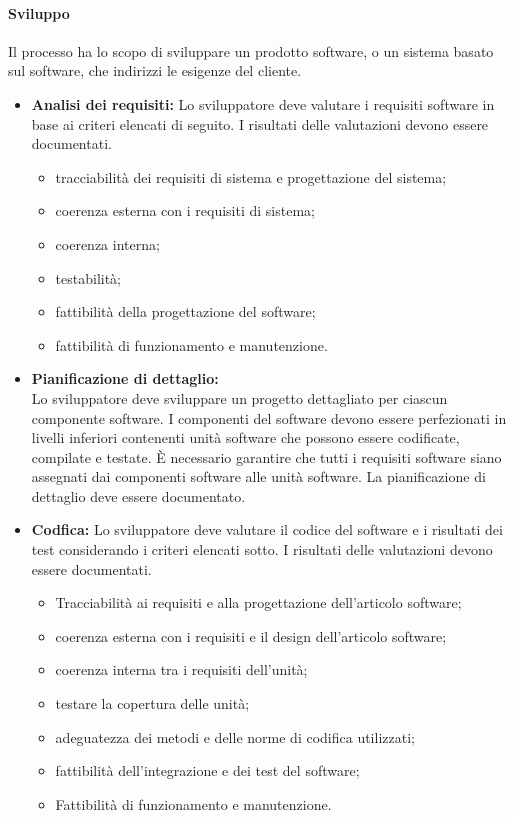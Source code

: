\paragraph{Sviluppo}
Il processo ha lo scopo di sviluppare un prodotto software, o un sistema basato sul software, che indirizzi le esigenze del cliente.
\begin{itemize}
    \item \textbf{Analisi dei requisiti:}
    Lo sviluppatore deve valutare i requisiti software in base ai criteri elencati di seguito. I risultati delle valutazioni devono essere documentati.
        \begin{itemize}
            \item tracciabilità dei requisiti di sistema e progettazione del sistema;
            \item coerenza esterna con i requisiti di sistema;
            \item coerenza interna;
            \item testabilità;
            \item fattibilità della progettazione del software;
            \item fattibilità di funzionamento e manutenzione.
        \end{itemize}
    \item \textbf{Pianificazione di dettaglio:}\\
    Lo sviluppatore deve sviluppare un progetto dettagliato per ciascun componente software. I componenti del software 
    devono essere perfezionati in livelli inferiori contenenti unità software che possono essere codificate, compilate 
    e testate. È necessario garantire che tutti i requisiti software siano assegnati dai componenti software 
    alle unità software. La pianificazione di dettaglio deve essere documentato.
    
    \item \textbf{Codfica:}
    Lo sviluppatore deve valutare il codice del software e i risultati dei test considerando i criteri elencati sotto. I risultati delle valutazioni devono essere documentati.
    \begin{itemize}
        \item Tracciabilità ai requisiti e alla progettazione dell'articolo software;
        \item coerenza esterna con i requisiti e il design dell'articolo software;
        \item coerenza interna tra i requisiti dell'unità;
        \item testare la copertura delle unità;
        \item adeguatezza dei metodi e delle norme di codifica utilizzati;
        \item fattibilità dell'integrazione e dei test del software;
        \item Fattibilità di funzionamento e manutenzione.   
    \end{itemize}
\end{itemize}
